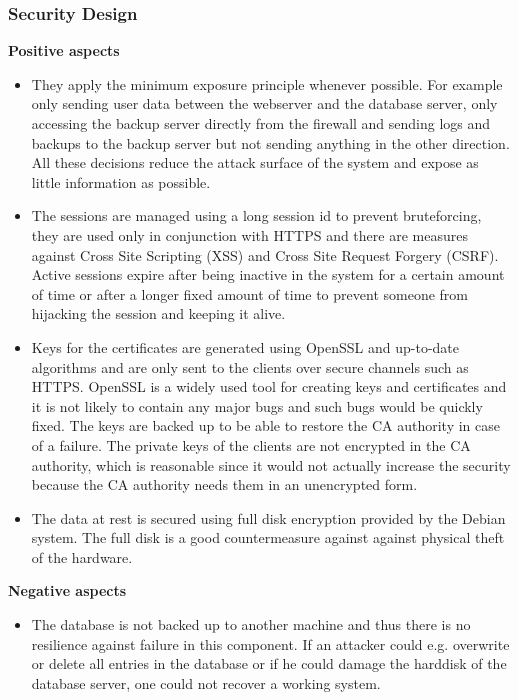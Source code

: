 \documentclass[english]{article}
\begin{document}
\subsubsection{Security Design}
\textbf{Positive aspects}
\begin{itemize}
\item They apply the minimum exposure principle whenever possible. For example only sending user data between the webserver and the database server, only accessing the backup server directly from the firewall and sending logs and backups to the backup server but not sending anything in the other direction. All these decisions reduce the attack surface of the system and expose as little information as possible.
\item The sessions are managed using a long session id to prevent bruteforcing, they are used only in conjunction with HTTPS and there are measures against Cross Site Scripting (XSS) and Cross Site Request Forgery (CSRF). Active sessions expire after being inactive in the system for a certain amount of time or after a longer fixed amount of time to prevent someone from hijacking the session and keeping it alive.
\item Keys for the certificates are generated using OpenSSL and up-to-date algorithms and are only sent to the clients over secure channels such as HTTPS. OpenSSL is a widely used tool for creating keys and certificates and it is not likely to contain any major bugs and such bugs would be quickly fixed. The keys are backed up to be able to restore the CA authority in case of a failure. The private keys of the clients are not encrypted in the CA authority, which is reasonable since it would not actually increase the security because the CA authority needs them in an unencrypted form.
\item The data at rest is secured using full disk encryption provided by the Debian system. The full disk is a good countermeasure against against physical theft of the hardware.
\end{itemize}

\textbf{Negative aspects}
\begin{itemize}
\item The database is not backed up to another machine and thus there is no resilience against failure in this component. If an attacker could e.g. overwrite or delete all entries in the database or if he could damage the harddisk of the database server, one could not recover a working system.
\end{itemize}
\end{document}
